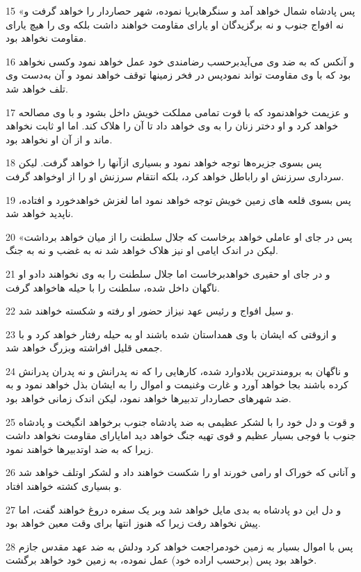 \par 15 «پس پادشاه شمال خواهد آمد و سنگرهابرپا نموده، شهر حصاردار را خواهد گرفت و نه افواج جنوب و نه برگزیدگان او یارای مقاومت خواهند داشت بلکه وی را هیچ یارای مقاومت نخواهد بود.
\par 16 و آنکس که به ضد وی می‌آیدبرحسب رضامندی خود عمل خواهد نمود وکسی نخواهد بود که با وی مقاومت تواند نمودپس در فخر زمینها توقف خواهد نمود و آن به‌دست وی تلف خواهد شد.
\par 17 و عزیمت خواهدنمود که با قوت تمامی مملکت خویش داخل بشود و با وی مصالحه خواهد کرد و او دختر زنان را به وی خواهد داد تا آن را هلاک کند. اما او ثابت نخواهد ماند و از آن او نخواهد بود.
\par 18 پس بسوی جزیره‌ها توجه خواهد نمود و بسیاری ازآنها را خواهد گرفت. لیکن سرداری سرزنش او راباطل خواهد کرد، بلکه انتقام سرزنش او را از اوخواهد گرفت.
\par 19 پس بسوی قلعه های زمین خویش توجه خواهد نمود اما لغزش خواهدخورد و افتاده، ناپدید خواهد شد.
\par 20 «پس در جای او عاملی خواهد برخاست که جلال سلطنت را از میان خواهد برداشت لیکن در اندک ایامی او نیز هلاک خواهد شد نه به غضب و نه به جنگ.
\par 21 و در جای او حقیری خواهدبرخاست اما جلال سلطنت را به وی نخواهند دادو او ناگهان داخل شده، سلطنت را با حیله هاخواهد گرفت.
\par 22 و سیل افواج و رئیس عهد نیزاز حضور او رفته و شکسته خواهند شد.
\par 23 و ازوقتی که ایشان با وی همداستان شده باشند او به حیله رفتار خواهد کرد و با جمعی قلیل افراشته وبزرگ خواهد شد.
\par 24 و ناگهان به برومندترین بلادوارد شده، کارهایی را که نه پدرانش و نه پدران پدرانش کرده باشند بجا خواهد آورد و غارت وغنیمت و اموال را به ایشان بذل خواهد نمود و به ضد شهرهای حصاردار تدبیرها خواهد نمود، لیکن اندک زمانی خواهد بود.
\par 25 و قوت و دل خود را با لشکر عظیمی به ضد پادشاه جنوب برخواهد انگیخت و پادشاه جنوب با فوجی بسیار عظیم و قوی تهیه جنگ خواهد دید امایارای مقاومت نخواهد داشت زیرا که به ضد اوتدبیرها خواهند نمود.
\par 26 و آنانی که خوراک او رامی خورند او را شکست خواهند داد و لشکر اوتلف خواهد شد و بسیاری کشته خواهند افتاد.
\par 27 و دل این دو پادشاه به بدی مایل خواهد شد وبر یک سفره دروغ خواهند گفت، اما پیش نخواهد رفت زیرا که هنوز انتها برای وقت معین خواهد بود.
\par 28 پس با اموال بسیار به زمین خودمراجعت خواهد کرد ودلش به ضد عهد مقدس جازم خواهد بود پس (برحسب اراده خود) عمل نموده، به زمین خود خواهد برگشت.
